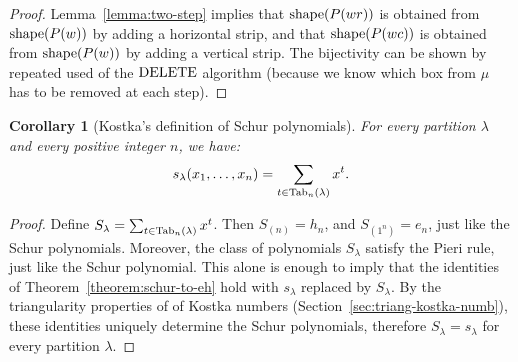 \documentclass[11pt]{amsproc}
\newtheorem{corollary}[theorem]{Corollary}
\theoremstyle{definition}
\theoremstyle{example}
\newcommand{\del}{\textup{DELETE}}
\newcommand{\shape}{\textup{shape}}
\newcommand{\Tab}{\textup{Tab}}
\begin{document}
\begin{proof}
  Lemma~\ref{lemma:two-step} implies that $\shape(P(wr))$ is obtained from\linebreak $\shape(P(w))$ by adding a horizontal strip, and that $\shape(P(wc))$ is obtained from $\shape(P(w))$ by adding a vertical strip.
  The bijectivity can be shown by repeated used of the $\del$ algorithm (because we know which box from $\mu$ has to be removed at each step).
\end{proof}
\begin{corollary}
  [Kostka's definition of Schur polynomials]
  \label{corollary:kostka-def-schur}
  For every partition $\lambda$ and every positive integer $n$, we have:
  \begin{displaymath}
    s_\lambda(x_1,\dotsc,x_n) = \sum_{t\in\Tab_n(\lambda)} x^t.
  \end{displaymath}
\end{corollary}
\begin{proof}
  Define $S_\lambda = \sum_{t\in \Tab_n(\lambda)} x^t$.
  Then $S_{(n)} = h_n$, and $S_{(1^n)} = e_n$, just like the Schur polynomials.
  Moreover, the class of polynomials $S_\lambda$ satisfy the Pieri rule, just like the Schur polynomial.
  This alone is enough to imply that the identities of Theorem~\ref{theorem:schur-to-eh} hold with $s_\lambda$ replaced by $S_\lambda$.
  By the triangularity properties of of Kostka numbers (Section~\ref{sec:triang-kostka-numb}), these identities uniquely determine the Schur polynomials, therefore $S_\lambda=s_\lambda$ for every partition $\lambda$.
\end{proof}
\end{document}
